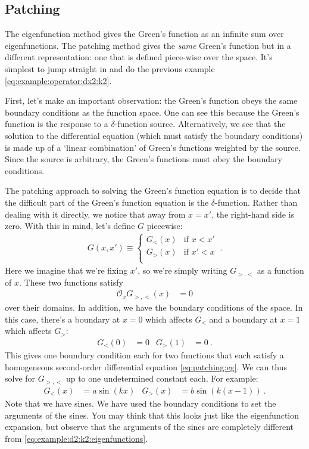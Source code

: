 \documentclass[12pt]{article}
\numberwithin{equation}{section}    %
\begin{document}
\subsection{Patching}

The eigenfunction method gives the Green’s function as an infinite sum over eigenfunctions. The patching method gives the \emph{same} Green’s function but in a different representation: one that is defined piece-wise over the space. It’s simplest to jump straight in and do the previous example \eqref{eq:example:operator:dx2:k2}.

First, let’s make an important observation: the Green’s function obeys the same boundary conditions as the function space. One can see this because the Green’s function is the response to a $\delta$-function source. Alternatively, we see that the solution to the differential equation (which must satisfy the boundary conditions) is made up of a `linear combination’ of Green’s functions weighted by the source. Since the source is arbitrary, the Green’s functions must obey the boundary conditions. 

The patching approach to solving the Green’s function equation is to decide that the difficult part of the Green’s function equation is the $\delta$-function. Rather than dealing with it directly, we notice that away from $x=x'$, the right-hand side is zero. With this in mind, let’s define $G$ piecewise:
\begin{align}
  G(x,x') \equiv 
  \begin{cases}
  G_<(x) & \text{if $x<x'$}\\
  G_>(x) & \text{if $x'<x$}\\
  \end{cases} \ .
\end{align}
Here we imagine that we’re fixing $x'$, so we’re simply writing $G_{>.<}$ as a function of $x$. These two functions satisfy
\begin{align}
  \mathcal O_x G_{>,<}(x) &= 0 
  \label{eq:patching:eg}
\end{align}
over their domains. In addition, we have the boundary conditions of the space. In this case, there’s a boundary at $x=0$ which affects $G_<$ and a boundary at $x=1$ which affects $G_>$:
\begin{align}
  G_<(0) &= 0  & G_>(1)&=0 \ .
\end{align}
This gives one boundary condition each for two functions that each satisfy a homogeneous second-order differential equation \eqref{eq:patching:eg}. We can thus solve for $G_{>,<}$ up to one undetermined constant each. For example:
\begin{align}
  G_<(x) &= a\sin(kx) & G_>(x) &= b\sin(k(x-1)) \ .
  \label{eq:example:patching:pieces}
\end{align}
Note that we have sines. We have used the boundary conditions to set the arguments of the sines. You may think that this looks just like the eigenfunction expansion, but observe that the arguments of the sines are completely different from \eqref{eq:example:d2:k2:eigenfunctions}.  
\end{document}
